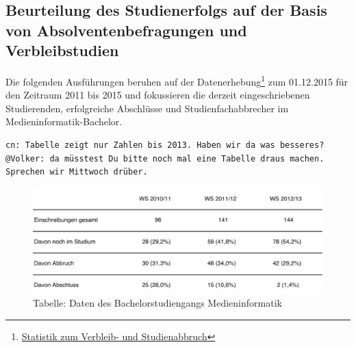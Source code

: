 \subsection{Beurteilung des Studienerfolgs auf der Basis von
Absolventenbefragungen und
Verbleibstudien}\label{beurteilung-des-studienerfolgs-auf-der-basis-von-absolventenbefragungen-und-verbleibstudien}

Die folgenden Ausführungen beruhen auf der Datenerhebung\footnote{\href{../anhaenge/verbleib-und-studienabbruch.pdf}{Statistik
  zum Verbleib- und Studienabbruch}} zum 01.12.2015 für den Zeitraum
2011 bis 2015 und fokussieren die derzeit eingeschriebenen Studierenden,
erfolgreiche Abschlüsse und Studienfachabbrecher im
Medieninformatik-Bachelor.

\begin{verbatim}
cn: Tabelle zeigt nur Zahlen bis 2013. Haben wir da was besseres?
@Volker: da müsstest Du bitte noch mal eine Tabelle draus machen. Sprechen wir Mittwoch drüber. 
\end{verbatim}

\begin{figure}[htbp]
\centering
\includegraphics[width=\columnwidth]{../anhaenge/tabellen/MI-BA-anzahl-studierende.pdf}
\caption{Tabelle: Daten des Bachelorstudiengangs Medieninformatik}
\end{figure}

